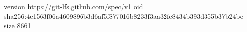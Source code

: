 version https://git-lfs.github.com/spec/v1
oid sha256:4e1563f06a4609896b3d6af5f877016b8233f3aa32fc8434b393d355b37b24be
size 8661
